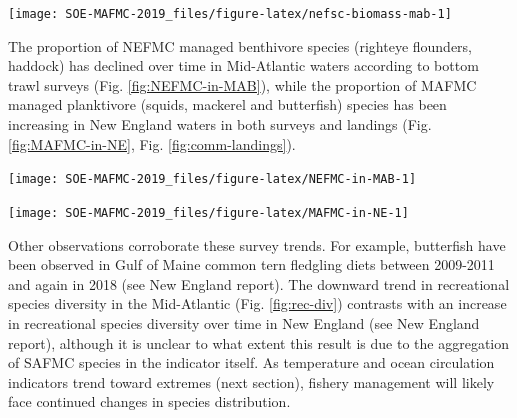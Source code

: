 \documentclass[10pt,]{article}
\let\origfigure\figure
\let\endorigfigure\endfigure
\renewenvironment{figure}[1][2] {
    \expandafter\origfigure\expandafter[H]
} {
    \endorigfigure
}
\begin{document}
\begin{figure}

{\centering \texttt{[image: SOE-MAFMC-2019\_files/figure-latex/nefsc-biomass-mab-1]} 

}

\caption{Fall (left) and spring (right) surveyed biomass in the Mid-Atlantic Bight. Data from the NEFSC Bottom Trawl Survey are shown in black, with NEAMAP shown in red.}\label{fig:nefsc-biomass-mab}
\end{figure}

The proportion of NEFMC managed benthivore species (righteye flounders,
haddock) has declined over time in Mid-Atlantic waters according to
bottom trawl surveys (Fig. \ref{fig:NEFMC-in-MAB}), while the proportion
of MAFMC managed planktivore (squids, mackerel and butterfish) species
has been increasing in New England waters in both surveys and landings
(Fig. \ref{fig:MAFMC-in-NE}, Fig. \ref{fig:comm-landings}).

\begin{figure}

{\centering \texttt{[image: SOE-MAFMC-2019\_files/figure-latex/NEFMC-in-MAB-1]} 

}

\caption{New England-managed survey proportion of MAB benthivores.}\label{fig:NEFMC-in-MAB}
\end{figure}

\begin{figure}

{\centering \texttt{[image: SOE-MAFMC-2019\_files/figure-latex/MAFMC-in-NE-1]} 

}

\caption{Mid-Atlantic-managed survey proportion of GOM and GB planktivores.}\label{fig:MAFMC-in-NE}
\end{figure}

Other observations corroborate these survey trends. For example,
butterfish have been observed in Gulf of Maine common tern fledgling
diets between 2009-2011 and again in 2018 (see New England report). The
downward trend in recreational species diversity in the Mid-Atlantic
(Fig. \ref{fig:rec-div}) contrasts with an increase in recreational
species diversity over time in New England (see New England report),
although it is unclear to what extent this result is due to the
aggregation of SAFMC species in the indicator itself. As temperature and
ocean circulation indicators trend toward extremes (next section),
fishery management will likely face continued changes in species
distribution.
\end{document}
